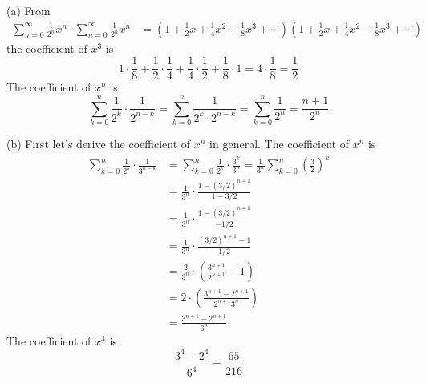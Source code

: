  
(a) From
\begin{align*}
\sum_{n = 0}^\infty \frac{1}{2^n} x^n \cdot \sum_{n = 0}^\infty \frac{1}{2^n} x^n
&=
\left(
1 + \frac{1}{2}x + \frac{1}{4}x^2 + \frac{1}{8}x^3 + \cdots
\right)
\left(
1 + \frac{1}{2}x + \frac{1}{4}x^2 + \frac{1}{8}x^3 + \cdots
\right)
\end{align*}
the coefficient of $x^3$ is
\[
1 \cdot \frac{1}{8}
+ \frac{1}{2} \cdot \frac{1}{4}
+ \frac{1}{4} \cdot \frac{1}{2}
+ \frac{1}{8} \cdot 1
= 4 \cdot \frac{1}{8} = \frac{1}{2}
\]
The coefficient of $x^n$ is
\[
\sum_{k=0}^n \frac{1}{2^k} \cdot \frac{1}{2^{n-k}}
= \sum_{k=0}^n \frac{1}{2^k \cdot 2^{n-k}}
= \sum_{k=0}^n \frac{1}{2^n}
= \frac{n + 1}{2^n}
\]

(b)
First let's derive the coefficient of $x^n$ in general. 
The coefficient of $x^n$ is
\begin{align*}
\sum_{k=0}^n \frac{1}{2^k} \cdot \frac{1}{3^{n-k}}
&= \sum_{k=0}^n \frac{1}{2^k} \cdot \frac{3^k}{3^n} 
= \frac{1}{3^n} \sum_{k=0}^n \left(\frac{3}{2}\right)^k \\
&= \frac{1}{3^n} \cdot \frac{1 - (3/2)^{n+1}}{1 - 3/2} \\
&= \frac{1}{3^n} \cdot \frac{1 - (3/2)^{n+1}}{-1/2} \\
&= \frac{1}{3^n} \cdot \frac{(3/2)^{n+1} - 1}{1/2} \\
&= \frac{2}{3^n} \cdot \left( \frac{3^{n+1}}{2^{n+1}} - 1 \right) \\
&= 2 \cdot \left( \frac{3^{n+1} - 2^{n+1}}{2^{n+1}3^n} \right) \\
&= \frac{3^{n+1} - 2^{n+1}}{6^n}
\end{align*}
The coefficient of $x^3$ is
\[
\frac{3^4 - 2^{4}}{6^4} = \frac{65}{216}
\]

